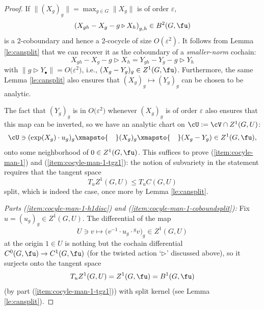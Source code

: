 \begin{proof}
 If $\|(X_g)_g\| = \max_{g\in G} \|X_g\|$ is of order $\varepsilon$,
 \begin{equation*}
 \left(X_{gh} - X_g - g\triangleright X_h\right)_{g,h}\in B^2(G,\fu)
 \end{equation*}
 is a 2-coboundary and hence a 2-cocycle of size $O(\varepsilon^2)$. It follows from Lemma \ref{le:cansplit} that we can recover it as the coboundary of a {\it smaller-norm} cochain:
 \begin{equation*}
 X_{gh} - X_g - g\triangleright X_h
 =
 Y_{gh} - Y_g - g\triangleright Y_h
 \end{equation*}
 with $\|g\triangleright Y_{\bullet}\|=O\big(\varepsilon^2\big)$, i.e., $(X_g-Y_g)_g\in Z^1(G,\fu)$.
 Furthermore, the same Lemma \ref{le:cansplit} also ensures that $(X_g)_g\mapsto (Y_g)_g$ can be chosen to be analytic.

 The fact that $(Y_g)_g$ is in $O\big(\varepsilon^2\big)$ whenever $(X_g)_g$ is of order $\varepsilon$ also ensures that this map can be inverted, so we have an analytic chart on $\cU:=\cV\cap Z^1(G,U)$:
 \begin{equation*}
 \cU\ni (\exp(X_g)\cdot u_g)_g
 \xmapsto{\quad}
 (X_g)_g
 \xmapsto{\quad}
 (X_g-Y_g)\in Z^1(G,\fu),
 \end{equation*}
 onto some neighborhood of $0\in Z^1(G,\fu)$. This suffices to prove (\ref{item:cocyle-man-1}) and (\ref{item:cocyle-man-1-tgz1}): the notion of subvariety in the statement requires that the tangent space
 \begin{equation*}
 T_u Z^1(G,U)\le T_u C(G,U)
 \end{equation*}
 split, which is indeed the case, once more by Lemma \ref{le:cansplit}.

\emph{ Parts {\rm(\ref{item:cocyle-man-1-h1disc})} and {\rm(\ref{item:cocyle-man-1-coboundsplit})}:} Fix $u=(u_g)_g\in Z^1(G,U)$.
 The differential of the map
 \begin{equation}\label{eq:noncommdiff}
 U\ni v\mapsto \big(v^{-1}\cdot u_g\cdot {}^g v\big)_g\in Z^1(G,U)
 \end{equation}
 at the origin $1\in U$ is nothing but the cochain differential $C^0(G,\fu)\to C^1(G,\fu)$ (for the twisted action `$\triangleright$' discussed above), so it surjects onto the tangent space
 \begin{equation*}
 T_u Z^1(G,U) = Z^1(G,\fu) = B^1(G,\fu)
 \end{equation*}
 (by part (\ref{item:cocyle-man-1-tgz1})) with split kernel (see Lemma \ref{le:cansplit}).


\end{proof}
